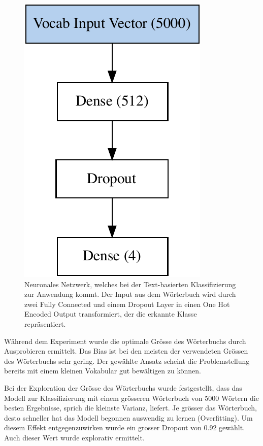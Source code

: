 \begin{figure}[h!]
    \captionsetup{width=.9\linewidth}
    \caption[Neuronales Netzwerk, welches bei der Text-basierten Klassifizierung zur Anwendung kommt]{Neuronales Netzwerk, welches bei der Text-basierten Klassifizierung zur Anwendung kommt. Der Input aus dem Wörterbuch wird durch zwei Fully Connected und einem Dropout Layer in einen One Hot Encoded Output transformiert, der die erkannte Klasse repräsentiert.}
    \label{text-classification-model}
    \centering
    \includegraphics[scale=0.6]{graphics/text-classification/model.pdf}
\end{figure} 

Während dem Experiment wurde die optimale Grösse des Wörterbuchs durch Ausprobieren ermittelt. Das Bias ist bei den meisten der verwendeten Grössen des Wörterbuchs sehr gering. Der gewählte Ansatz scheint die Problemstellung bereits mit einem kleinen Vokabular gut bewältigen zu können.

Bei der Exploration der Grösse des Wörterbuchs wurde festgestellt, dass das Modell zur Klassifizierung mit einem grösseren Wörterbuch von 5000 Wörtern die besten Ergebnisse, sprich die kleinste Varianz, liefert. Je grösser das Wörterbuch, desto schneller hat das Modell begonnen auswendig zu lernen (Overfitting). Um diesem Effekt entgegenzuwirken wurde ein grosser Dropout von 0.92 gewählt. Auch dieser Wert wurde explorativ ermittelt.

